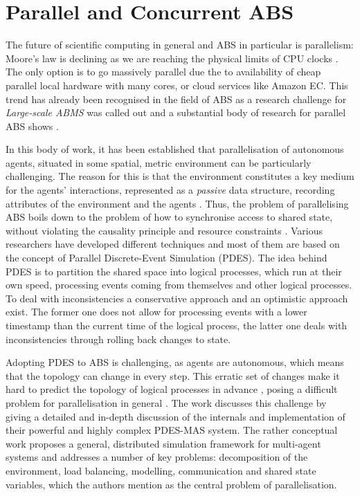 \chapter{Parallel and Concurrent ABS}
\label{ch:parallel_abs}
The future of scientific computing in general and ABS in particular is parallelism: Moore's law is declining as we are reaching the physical limits of CPU clocks \cite{sutter2005free}. The only option is to go massively parallel due the to availability of cheap parallel local hardware with many cores, or cloud services like Amazon EC. This trend has already been recognised in the field of ABS as a research challenge for \textit{Large-scale ABMS} \cite{macal_everything_2016} was called out and a substantial body of research for parallel ABS shows \cite{abar_agent_2017, cicirelli_efficient_2015,  gasser_mace3j:_2002,  gorur_repast_2016, hay_experiments_2015, himmelspach_plugn_2007, lees_using_2008, logan_distributed_2001, minson_distributing_2008, riley_next_2003, suryanarayanan_synchronised_2013, suryanarayanan_pdes-mas_2013}. 

In this body of work, it has been established that parallelisation of autonomous agents, situated in some spatial, metric environment can be particularly challenging. The reason for this is that the environment constitutes a key medium for the agents' interactions, represented as a \textit{passive} data structure, recording attributes of the environment and the agents \cite{lees_using_2008}. Thus, the problem of parallelising ABS boils down to the problem of how to synchronise access to shared state, without violating the causality principle and resource constraints \cite{logan_distributed_2001, suryanarayanan_pdes-mas_2013}. Various researchers have developed different techniques and most of them are based on the concept of Parallel Discrete-Event Simulation (PDES). The idea behind PDES is to partition the shared space into logical processes, which run at their own speed, processing events coming from themselves and other logical processes. To deal with inconsistencies a conservative approach and an optimistic approach exist. The former one does not allow for processing events with a lower timestamp than the current time of the logical process, the latter one deals with inconsistencies through rolling back changes to state.

Adopting PDES to ABS is challenging, as agents are autonomous, which means that the topology can change in every step. This erratic set of changes make it hard to predict the topology of logical processes in advance \cite{lees_using_2008}, posing a difficult problem for parallelisation in general \cite{cicirelli_efficient_2015}. The work \cite{suryanarayanan_synchronised_2013, suryanarayanan_pdes-mas_2013} discusses this challenge by giving a detailed and in-depth discussion of the internals and implementation of their powerful and highly complex PDES-MAS system. The rather conceptual work \cite{logan_distributed_2001} proposes a general, distributed simulation framework for multi-agent systems and addresses a number of key problems: decomposition of the environment, load balancing, modelling, communication and shared state variables, which the authors mention as the central problem of parallelisation.

